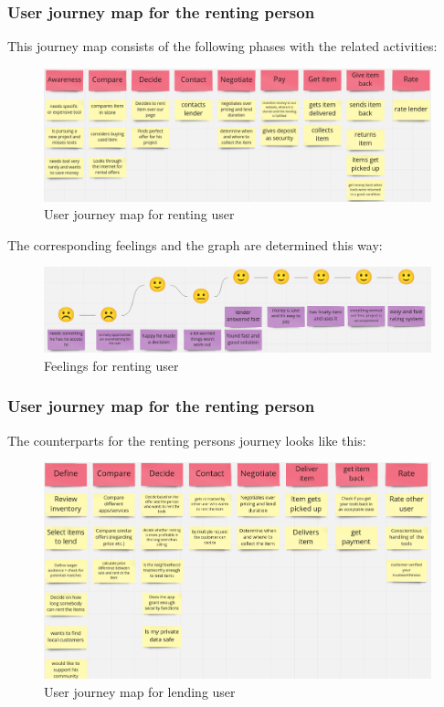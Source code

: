 		\subsubsection{User journey map for the renting person}
			This journey map consists of the following phases with the related activities:
			
			\begin{figure}[H]
				\centering
				\includegraphics[width=\linewidth]{abb/2_context_of_use/user_journey_map_renting.png}
				\caption{User journey map for renting user}
				\label{fig:ujm_renting}
			\end{figure}
			
			\noindent
			The corresponding feelings and the graph are determined this way:
			
			\begin{figure}[H]
				\centering
				\includegraphics[width=\linewidth]{abb/2_context_of_use/feelings_renting.png}
				\caption{Feelings for renting user}
				\label{fig:ujm_renting_feelings}
			\end{figure}
		
		\subsubsection{User journey map for the renting person}
			The counterparts for the renting persons journey looks like this:
			
			\begin{figure}[H]
				\centering
				\includegraphics[width=\linewidth]{abb/2_context_of_use/user_journey_map_lending.png}
				\caption{User journey map for lending user}
				\label{fig:ujm_lending}
			\end{figure}
		
